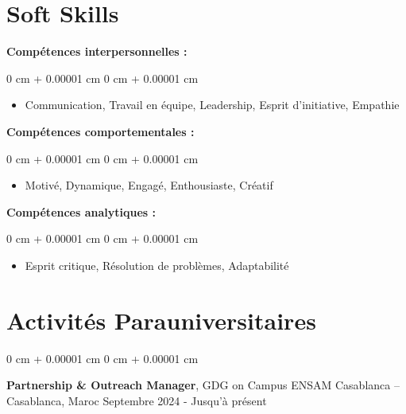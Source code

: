 \documentclass[10pt, letterpaper]{article}
\newenvironment{highlights}{
    \begin{itemize}[
        topsep=0.10 cm,
        parsep=0.10 cm,
        partopsep=0pt,
        itemsep=0pt,
        leftmargin=0 cm + 10pt
    ]
}{
    \end{itemize}
} %
\newenvironment{onecolentry}{
    \begin{adjustwidth}{
        0 cm + 0.00001 cm
    }{
        0 cm + 0.00001 cm
    }
}{
    \end{adjustwidth}
} %
\newenvironment{twocolentry}[2][]{
    \onecolentry
    \def\secondColumn{#2}
    \setcolumnwidth{\fill, 5 cm}
    \begin{paracol}{2}
}{
    \switchcolumn \raggedleft \secondColumn
    \end{paracol}
    \endonecolentry
} %
\begin{document}
			
		\section{Soft Skills}
		
		\textbf{Compétences interpersonnelles :}
		
		\vspace{0.10 cm}
		\begin{onecolentry}
			\begin{highlights}
				\item Communication, Travail en équipe, Leadership, Esprit d'initiative, Empathie
			\end{highlights}
		\end{onecolentry}
		
		\vspace{0.2 cm}
		
		
		\textbf{Compétences comportementales :}
		
		\vspace{0.10 cm}
		\begin{onecolentry}
			\begin{highlights}
				\item Motivé, Dynamique, Engagé, Enthousiaste, Créatif
			\end{highlights}
		\end{onecolentry}
		
		\vspace{0.2 cm}
		
		
		\textbf{Compétences analytiques :}
		
		\vspace{0.10 cm}
		\begin{onecolentry}
			\begin{highlights}
				\item Esprit critique, Résolution de problèmes, Adaptabilité
			\end{highlights}
		\end{onecolentry}
		
		\vspace{0.2 cm}
		
		
		
		\section{Activités Parauniversitaires}
		
		\begin{twocolentry}{
				Septembre 2024 - Jusqu'à présent
			}
			\textbf{Partnership \& Outreach Manager}, GDG on Campus ENSAM Casablanca -- Casablanca, Maroc\end{twocolentry}
		
\end{document}
